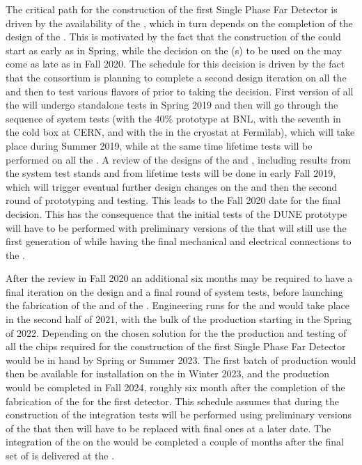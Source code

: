 The critical path for the construction of the first Single Phase
 Far Detector is driven by the availability of the ,
which in turn depends on the completion of the design of the
. This is motivated by the fact that the construction
of the  could start as early as in Spring, while the
decision on the (s) to be used on the 
may come as late as in Fall 2020. The schedule for this decision
is driven by the fact that the  consortium is
planning to complete a second design iteration on all the 
and then to test various flavors of  prior to taking
the decision. First version of all the  will undergo
standalone tests in Spring 2019 and then will go through the 
sequence of system tests (with the 40\%  prototype at BNL,
with the seventh   in the cold box at CERN,
and with the  in the  cryostat at Fermilab), which
will take place during Summer 2019, while at the same time lifetime
tests will be performed on all the . A review of the 
designs of the  and , including results
from the system test stands and from lifetime tests will be done
in early Fall 2019, which will trigger eventual further design
changes on the  and then the second round of prototyping
and testing. This leads to the Fall 2020 date for the final
 decision. This has the consequence that the initial
tests of the DUNE prototype  will have to be performed
with preliminary versions of the  that will still use
the first generation of  while having the final 
mechanical and electrical connections to the .

After the review in Fall 2020 an additional six months may be 
required to have a final iteration on the  design
and a final round of system tests, before launching the fabrication
of the  and of the . Engineering runs
for the  and  would take place in the
second half of 2021, with the bulk of the production starting in
the Spring of 2022. Depending on the chosen solution for the
 the production and testing of all the chips required
for the construction of the first Single Phase  Far Detector
would be in hand by Spring or Summer 2023. The first batch of
production  would then be available for installation on
the  in Winter 2023, and the production would be
completed in Fall 2024, roughly six month after the completion
of the fabrication of the  for the first detector.
This schedule assumes that during the construction of the 
 integration tests will be performed using preliminary
versions of the  that then will have to be replaced
with final ones at a later date. The integration of the 
on the  would be completed a couple of months after
the final set of  is delivered at the .

